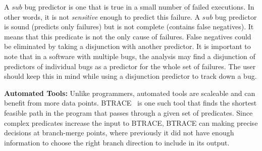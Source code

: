 A $sub$ bug predictor is one that is true in a small number of failed executions.  In other words, it is not {\em sensitive} enough to predict this failure.  A $sub$ bug predictor is sound (predicts only failures) but is not complete (contains false negatives).  It means that this predicate is not the only cause of failures.  False negatives could be eliminated by taking a disjunction with another predictor.  It is important to note that in a software with multiple bugs, the analysis may find a disjunction of predictors of individual bugs as a predictor for the whole set of failures.  The user should keep this in mind while using a disjunction predictor to track down a bug.

\vspace{4pt} \noindent
{\bf Automated Tools:}  Unlike programmers, automated tools are scaleable and can benefit from more data points.  BTRACE~\cite{Lal:2006:POPAD} is one such tool that finds the shortest feasible path in the program that passes through a given set of predicates.  Since complex predicates increase the input to BTRACE, BTRACE can making precise decisions at branch-merge points, where previously it did not have enough information to choose the right branch direction to include in its output.

